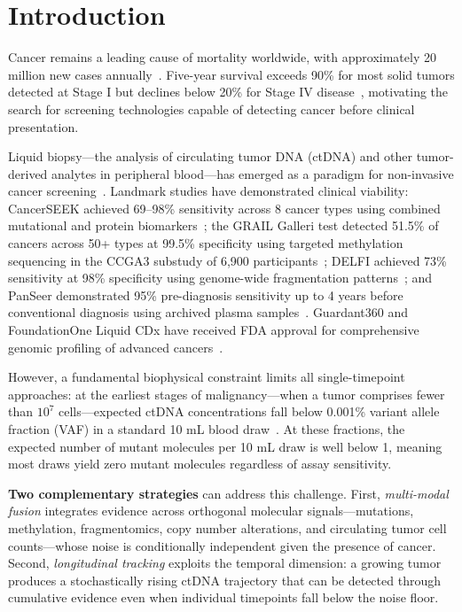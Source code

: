\documentclass[10pt,a4paper]{article}
\begin{document}

\section{Introduction}

Cancer remains a leading cause of mortality worldwide, with approximately 20 million new cases annually~\cite{sung2021global}. Five-year survival exceeds 90\% for most solid tumors detected at Stage I but declines below 20\% for Stage IV disease~\cite{siegel2024cancer}, motivating the search for screening technologies capable of detecting cancer before clinical presentation.

Liquid biopsy—the analysis of circulating tumor DNA (ctDNA) and other tumor-derived analytes in peripheral blood—has emerged as a paradigm for non-invasive cancer screening~\cite{wan2017liquid,heitzer2019current}. Landmark studies have demonstrated clinical viability: CancerSEEK achieved 69--98\% sensitivity across 8 cancer types using combined mutational and protein biomarkers~\cite{cohen2018detection}; the GRAIL Galleri test detected 51.5\% of cancers across 50+ types at 99.5\% specificity using targeted methylation sequencing in the CCGA3 substudy of 6,900 participants~\cite{klein2021clinical}; DELFI achieved 73\% sensitivity at 98\% specificity using genome-wide fragmentation patterns~\cite{cristiano2019genome}; and PanSeer demonstrated 95\% pre-diagnosis sensitivity up to 4 years before conventional diagnosis using archived plasma samples~\cite{chen2020non}. Guardant360 and FoundationOne Liquid CDx have received FDA approval for comprehensive genomic profiling of advanced cancers~\cite{woodhouse2020clinical}.

However, a fundamental biophysical constraint limits all single-timepoint approaches: at the earliest stages of malignancy—when a tumor comprises fewer than $10^7$ cells—expected ctDNA concentrations fall below 0.001\% variant allele fraction (VAF) in a standard 10 mL blood draw~\cite{avanzini2020mathematical,bettegowda2014detection}. At these fractions, the expected number of mutant molecules per 10 mL draw is well below 1, meaning most draws yield zero mutant molecules regardless of assay sensitivity.

\textbf{Two complementary strategies} can address this challenge. First, \textit{multi-modal fusion} integrates evidence across orthogonal molecular signals—mutations, methylation, fragmentomics, copy number alterations, and circulating tumor cell counts—whose noise is conditionally independent given the presence of cancer. Second, \textit{longitudinal tracking} exploits the temporal dimension: a growing tumor produces a stochastically rising ctDNA trajectory that can be detected through cumulative evidence even when individual timepoints fall below the noise floor.
\end{document}
